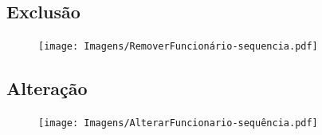 \newpage

\subsection{Exclusão}

\begin{figure}[h]
    \centering
    \texttt{[image: Imagens/RemoverFuncionário-sequencia.pdf]}
\end{figure}

\newpage

\subsection{Alteração}

\begin{figure}[h]
    \centering
    \texttt{[image: Imagens/AlterarFuncionario-sequência.pdf]}
\end{figure}
